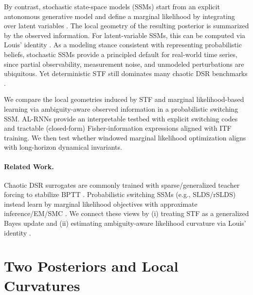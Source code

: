 \documentclass[twoside]{article}
\theoremstyle{plain}
\theoremstyle{definition}
\theoremstyle{remark}
\begin{document}
By contrast, stochastic state-space models (SSMs) start from an explicit autonomous generative model and define a marginal likelihood by integrating over latent variables \citep{durbin2001ssm}. The local geometry of the resulting posterior is summarized by the observed information. For latent-variable SSMs, this can be computed via Louis' identity \citep{louis1982}.
As a modeling stance consistent with representing probabilistic beliefs, stochastic SSMs provide a principled default for real-world time series, since partial observability, measurement noise, and unmodeled perturbations are ubiquitous. Yet deterministic STF still dominates many chaotic DSR benchmarks \citep{hess2023gtf}.

We compare the local geometries induced by STF and marginal likelihood-based learning via ambiguity-aware observed information in a probabilistic switching SSM. AL-RNNs provide an interpretable testbed with explicit switching codes and tractable (closed-form) Fisher-information expressions aligned with ITF training. We then test whether windowed marginal likelihood optimization aligns with long-horizon dynamical invariants.
\paragraph{Related Work.}
Chaotic DSR surrogates are commonly trained with sparse/generalized teacher forcing to stabilize BPTT \citep{mikhaeil2022chaosrnn,hess2023gtf,brenner2024alrnn}. Probabilistic switching SSMs (e.g., SLDS/rSLDS) instead learn by marginal likelihood objectives with approximate inference/EM/SMC \citep{ghahramani2000switchingssm,murphy1998switchingkf,linderman2017rslds}. We connect these views by (i) treating STF as a generalized Bayes update \citep{catoni2007pacbayes,bissiri2016generalbayes} and (ii) estimating ambiguity-aware likelihood curvature via Louis’ identity \citep{louis1982}.
\vspace{-0.5em}
\section{Two Posteriors and Local Curvatures}
\vspace{-0.5em}
\label{sec:twoposteriors}
\end{document}
